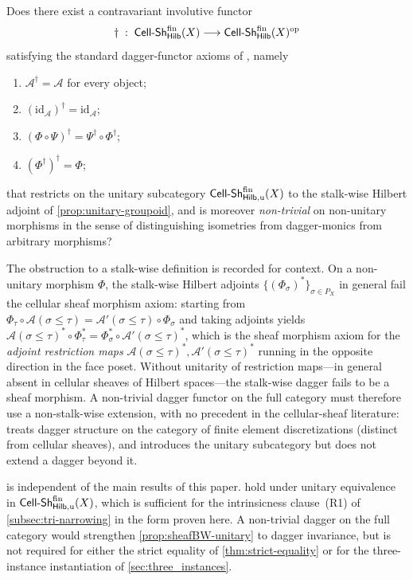 \begin{openproblem}
\label{op:non-trivial-dagger}
Does there exist a contravariant involutive functor
\[
  \dagger \;:\; \mathsf{Cell\text{-}Sh}^{\mathrm{fin}}_{\mathsf{Hilb}}(X)
  \longrightarrow \mathsf{Cell\text{-}Sh}^{\mathrm{fin}}_{\mathsf{Hilb}}(X)^{\mathrm{op}}
\]
satisfying the standard dagger-functor axioms of
\cite[\S 2.3, 2.18--2.19]{HeunenVicary2019}, namely
\begin{enumerate}[label=(D\arabic*)]
  \item $\mathscr{A}^\dagger = \mathscr{A}$ for every object;
  \item $(\mathrm{id}_{\mathscr{A}})^\dagger = \mathrm{id}_{\mathscr{A}}$;
  \item $(\Phi \circ \Psi)^\dagger = \Psi^\dagger \circ \Phi^\dagger$;
  \item $(\Phi^\dagger)^\dagger = \Phi$;
\end{enumerate}
that restricts on the unitary subcategory
$\mathsf{Cell\text{-}Sh}^{\mathrm{fin}}_{\mathsf{Hilb},\mathrm{u}}(X)$ to the stalk-wise Hilbert
adjoint of \cref{prop:unitary-groupoid}, and is moreover
\emph{non-trivial} on non-unitary morphisms in the sense of
distinguishing isometries from dagger-monics from arbitrary morphisms?
\end{openproblem}

The obstruction to a stalk-wise definition is recorded for context.
On a non-unitary morphism $\Phi$, the stalk-wise Hilbert adjoints
$\{(\Phi_\sigma)^*\}_{\sigma \in P_X}$ in general fail the cellular
sheaf morphism axiom: starting from
$\Phi_\tau \circ \mathscr{A}(\sigma \le \tau) =
\mathscr{A}'(\sigma \le \tau) \circ \Phi_\sigma$ and taking adjoints
yields
$\mathscr{A}(\sigma \le \tau)^* \circ \Phi_\tau^* =
\Phi_\sigma^* \circ \mathscr{A}'(\sigma \le \tau)^*$, which is the
sheaf morphism axiom for the \emph{adjoint restriction maps}
$\mathscr{A}(\sigma \le \tau)^*, \mathscr{A}'(\sigma \le \tau)^*$
running in the opposite direction in the face poset. Without
unitarity of restriction maps---in general absent in cellular
sheaves of Hilbert spaces---the stalk-wise dagger fails to be a
sheaf morphism. A non-trivial dagger functor on the full category
must therefore use a non-stalk-wise extension, with no precedent in
the cellular-sheaf literature: \cite{LahtinenStenvall2020} treats
dagger structure on the category of finite element discretizations
(distinct from cellular sheaves), and \cite{HansenGhrist2019}
introduces the unitary subcategory but does not extend a dagger
beyond it.

 is independent of the main results of
this paper.  hold
under unitary equivalence in
$\mathsf{Cell\text{-}Sh}^{\mathrm{fin}}_{\mathsf{Hilb},\mathrm{u}}(X)$, which is sufficient for the
intrinsicness clause~\textup{(R1)} of \cref{subsec:tri-narrowing}
in the form proven here. A non-trivial dagger on the full category
would strengthen \cref{prop:sheafBW-unitary} to dagger invariance,
but is not required for either the strict equality of
\cref{thm:strict-equality} or for the three-instance instantiation
of \cref{sec:three_instances}.

